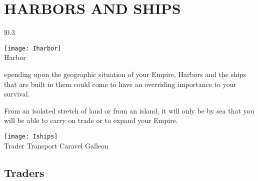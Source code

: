 
\chapter[Harbors and Ships]{{\Huge H}ARBORS AND {\Huge S}HIPS}


\begin{wrapfigure}{l}{0.3\textwidth}
    \vspace{-20pt}
    \begin{center}
        \texttt{[image: Iharbor]} %
        \\ Harbor
    \end{center}
    \vspace{-45pt}
\end{wrapfigure}

epending upon the geographic situation of your Empire, Harbors and the ships that are built in them could come to have an overriding importance to your survival.

From an isolated stretch of land or from an island, it will only be by sea that you will be able to carry on trade or to expand your Empire.


\begin{center}
    \texttt{[image: Iships]} %
    \\ Trader Transport Caravel Galleon
\end{center}

\section{\textsf{Traders}}

